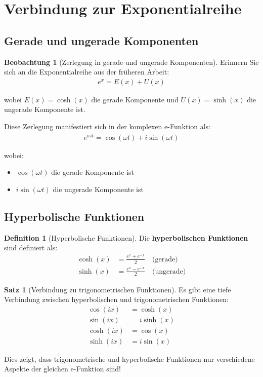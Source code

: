 ﻿\documentclass[a4paper,12pt]{report}
\theoremstyle{definition}
\newtheorem{definition}{Definition}
\newtheorem{satz}{Satz}
\newtheorem{beobachtung}{Beobachtung}
\begin{document}
	\section{Verbindung zur Exponentialreihe}
	
	\subsection{Gerade und ungerade Komponenten}
	
	\begin{beobachtung}[Zerlegung in gerade und ungerade Komponenten]
		Erinnern Sie sich an die Exponentialreihe aus der früheren Arbeit:
		\begin{align}
			e^x = E(x) + U(x)
		\end{align}
		
		wobei $E(x) = \cosh(x)$ die gerade Komponente und $U(x) = \sinh(x)$ die ungerade Komponente ist.
		
		Diese Zerlegung manifestiert sich in der komplexen e-Funktion als:
		\begin{align}
			e^{i\omega t} = \cos(\omega t) + i\sin(\omega t)
		\end{align}
		
		wobei:
		\begin{itemize}
			\item[-] $\cos(\omega t)$ die gerade Komponente ist
			\item[-] $i\sin(\omega t)$ die ungerade Komponente ist
		\end{itemize}
	\end{beobachtung}
	
	\subsection{Hyperbolische Funktionen}
	
	\begin{definition}[Hyperbolische Funktionen]
		Die \textbf{hyperbolischen Funktionen} sind definiert als:
		\begin{align}
			\cosh(x) &= \frac{e^x + e^{-x}}{2} \quad \text{(gerade)} \\
			\sinh(x) &= \frac{e^x - e^{-x}}{2} \quad \text{(ungerade)}
		\end{align}
	\end{definition}
	
	\begin{satz}[Verbindung zu trigonometrischen Funktionen]
		Es gibt eine tiefe Verbindung zwischen hyperbolischen und trigonometrischen Funktionen:
		\begin{align}
			\cos(ix) &= \cosh(x) \\
			\sin(ix) &= i\sinh(x) \\
			\cosh(ix) &= \cos(x) \\
			\sinh(ix) &= i\sin(x)
		\end{align}
		
		Dies zeigt, dass trigonometrische und hyperbolische Funktionen nur verschiedene Aspekte der gleichen e-Funktion sind!
	\end{satz}
	
\end{document}
